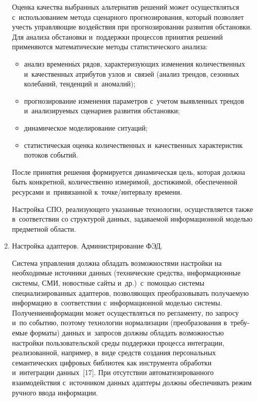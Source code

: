\begin{multicols}{2}
\begin{enumerate}[1.]
{}
    
    Оценка качества выбранных альтернатив решений может 
осуществляться с~использова\-нием метода сценарного прогнозирования,\linebreak 
который позволяет учесть управляющие воздействия при прогнозировании 
развития обстановки. Для анализа обстановки и~поддержки процессов 
принятия решений применяются математические методы статистического 
анализа:
{ %

}

\noindent
    \begin{itemize}
\item анализ временн$\acute{\mbox{ы}}$х рядов, характеризующих изменения количественных 
и~качественных атрибутов узлов и~связей (анализ трендов, сезонных 
колебаний, тенденций и~аномалий);
\item прогнозирование изменения параметров с~учетом выявленных трендов 
и~анализируемых сценариев развития обстановки;
\item динамическое моделирование ситуаций;
\item статистическая оценка количественных и~качественных характеристик 
потоков событий.
\end{itemize}

    После принятия решения формируется динамическая цель, которая 
должна быть конкретной, количественно измеримой, достижимой,  
обеспеченной ресурсами и~привязанной к~точ\-ке/ин\-тер\-ва\-лу времени.
    
    Настройка СПО, реализующего указанные технологии, осуществляется 
также в~соответствии со структурой данных, за\-да\-ва\-емой информационной 
моделью предметной об\-ласти.
    
  \item  Настройка адаптеров. Администрирование ФЭД.
    
    Система управления должна обладать возможностями настройки на 
необходимые источники данных (технические средства, информационные 
сис\-те\-мы, СМИ, новостные сайты и~др.)\ с~по\-мощью сис\-те\-мы 
специализированных адап\-те\-ров, поз\-во\-ля\-ющих преобразовывать по\-лу\-ча\-емую 
информацию в~соответствии с~информационной моделью сис\-те\-мы.  
Получение\linebreak информации может осуществляться по регламенту, по запросу 
и~по событию, поэтому техно\-логии нормализации (преобразования 
в~тре\-бу-\linebreak емые форматы) данных и~запросов должны обладать воз\-мож\-ностью 
настройки пользовательской среды поддержки процесса интеграции, 
реализованной, например, в~виде средств создания персональных 
семантических цифровых биб\-лио\-тек как инструмента обработки 
и~интеграции данных~[17]. При отсутствии автоматизированного 
взаимодействия с~источником данных адаптеры должны обеспечивать режим 
ручного ввода информации.


\end{enumerate}
\end{multicols}
